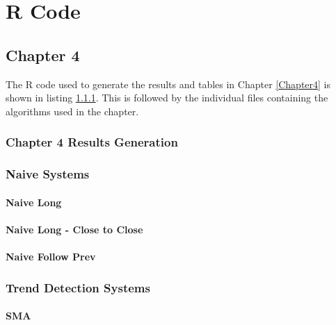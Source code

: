 
\chapter{R Code} %

\label{AppendixA} %

\section{Chapter 4}
The R code used to generate the results and tables in Chapter \ref{Chapter4} is shown in listing \ref{appA:Chp4_R}. This is followed by the individual files containing the algorithms used in the chapter.

\subsection{Chapter 4 Results Generation}
\label{appA:Chp4_R}


\subsection{Naive Systems}
\subsubsection{Naive Long}
\label{appA:NaiveLong}


\subsubsection{Naive Long - Close to Close}
\label{appA:NaiveLong_2}


\subsubsection{Naive Follow Prev}
\label{appA:NaiveFollowPrev}


\subsection{Trend Detection Systems}
\subsubsection{SMA}
\label{appA:SMA_sys}


